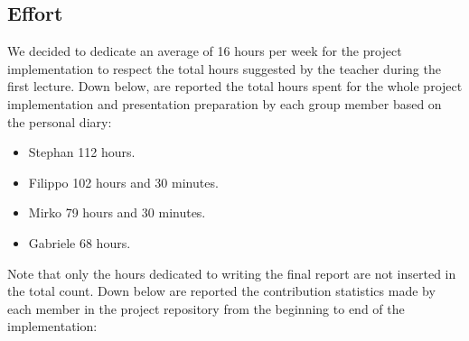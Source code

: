 \subsection{Effort}
We decided to dedicate an average of 16 hours per week for the project implementation to respect the total hours suggested by the teacher during the first lecture.\newline
Down below, are reported the total hours spent for the whole project implementation and presentation preparation by each group member based on the personal diary:
\begin{itemize}
 \item Stephan 112 hours.
 \item Filippo 102 hours and 30 minutes.
 \item Mirko 79 hours and 30 minutes.
 \item Gabriele 68 hours.
\end{itemize}
Note that only the hours dedicated to writing the final report are not inserted in the total count.\newline
Down below are reported the contribution statistics made by each member in the project repository from the beginning to end of the implementation:
